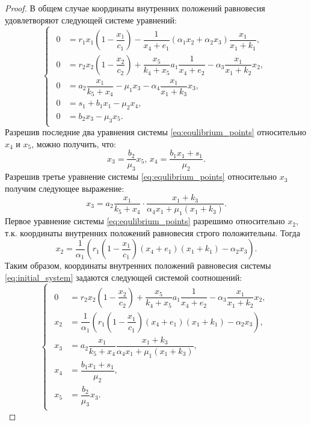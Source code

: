 \documentclass[14pt,a4paper]{extarticle}
\begin{document}
	\begin{proof}
		В общем случае координаты внутренних положений равновесия удовлетворяют следующей системе уравнений:
		\begin{equation}\label{eq:equlibrium_points}
			\begin{cases}
				\begin{aligned}
					0 &= r_1x_1\left(1-\dfrac{x_1}{c_1}\right)-\dfrac{1}{x_4+e_1}(\alpha_1x_2+\alpha_2x_3)\dfrac{x_1}{x_1+k_1},\\
					0 &= r_2x_2\left(1-\dfrac{x_2}{c_2}\right)+\dfrac{x_5}{k_4+x_5}a_1\dfrac{1}{x_4+e_2}-\alpha_3\dfrac{x_1}{x_1+k_2}x_2,\\
					0 &= a_2\dfrac{x_1}{k_5+x_4}-\mu_1x_3-\alpha_4\dfrac{x_1}{x_1+k_3}x_3,\\
					0 &= s_1 + b_1x_1-\mu_2x_4,\\
					0 &= b_2x_3-\mu_3x_5.
				\end{aligned}
			\end{cases}
		\end{equation}
		Разрешив последние два уравнения системы \ref{eq:equlibrium_points} относительно $x_4$ и $x_5$, можно получить, что: 
		\[x_3=\dfrac{b_2}{\mu_3}x_5,\, x_4=\dfrac{b_1x_1+s_1}{\mu_2}.\]
		Разрешив третье уравнение системы \ref{eq:equlibrium_points} относительно $x_3$ получим следующее выражение:
		\[x_3 = a_2\dfrac{x_1}{k_5+x_4}\cdot\dfrac{x_1+k_3}{\alpha_4x_1+\mu_1(x_1+k_3)}.\]
		Первое уравнение системы \ref{eq:equlibrium_points} разрешимо относительно $x_2$, т.к. координаты внутренних положений равновесия строго положительны. Тогда
		\[x_2 = \dfrac{1}{\alpha_1}\left(r_1\left(1-\dfrac{x_1}{c_1}\right)(x_4+e_1)(x_1+k_1)-\alpha_2x_3\right).\]
		Таким образом, координаты внутренних положений равновесия системы \ref{eq:initial_system} задаются следующей системой соотношений:
		\begin{equation}\label{eq:P3_equations}
			\begin{cases}
				\begin{aligned}
					0 &= r_2x_2\left(1-\dfrac{x_2}{c_2}\right)+\dfrac{x_5}{k_4+x_5}a_1\dfrac{1}{x_4+e_2}-\alpha_3\dfrac{x_1}{x_1+k_2}x_2,\\
					x_2 &= \dfrac{1}{\alpha_1}\left(r_1\left(1-\dfrac{x_1}{c_1}\right)(x_4+e_1)(x_1+k_1)-\alpha_2x_3\right),\\
					x_3 &= a_2\dfrac{x_1}{k_5+x_4}\dfrac{x_1+k_3}{\alpha_4x_1+\mu_1(x_1+k_3)},\\
					x_4 &= \dfrac{b_1x_1+s_1}{\mu_2},\\
					x_5 &= \dfrac{b_2}{\mu_3}x_3.

\end{aligned}
\end{cases}
\end{equation}
\end{proof}
\end{document}
